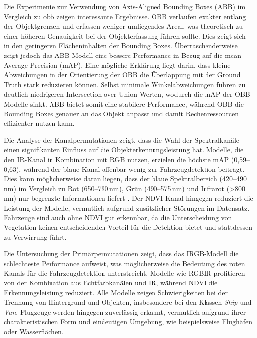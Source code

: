 Die Experimente zur Verwendung von Axis-Aligned Bounding Boxes (ABB) im Vergleich zu \acrfull{obb} zeigen interessante Ergebnisse. OBB verlaufen exakter entlang der Objektgrenzen und erfassen weniger umliegendes Areal, was theoretisch zu einer höheren Genauigkeit bei der Objekterfassung führen sollte. Dies zeigt sich in den geringeren Flächeninhalten der Bounding Boxes. Überraschenderweise zeigt jedoch das ABB-Modell eine bessere Performance in Bezug auf die mean Average Precision (mAP). Eine mögliche Erklärung liegt darin, dass kleine Abweichungen in der Orientierung der OBB die Überlappung mit der Ground Truth stark reduzieren können. Selbst minimale Winkelabweichungen führen zu deutlich niedrigeren Intersection-over-Union-Werten, wodurch die mAP der OBB-Modelle sinkt. ABB bietet somit eine stabilere Performance, während OBB die Bounding Boxes genauer an das Objekt anpasst und damit Rechenressourcen effizienter nutzen kann. 

Die Analyse der Kanalpermutationen zeigt, dass die Wahl der Spektralkanäle einen signifikanten Einfluss auf die Objekterkennungsleistung hat. Modelle, die den IR-Kanal in Kombination mit RGB nutzen, erzielen die höchste mAP (0,59--0,63), während der blaue Kanal offenbar wenig zur Fahrzeugdetektion beiträgt. Dies kann möglicherweise daran liegen, dass der blaue Spektralbereich (420–490\,nm) im Vergleich zu Rot (650–780\,nm), Grün (490–575\,nm) und Infrarot (>800\,nm) nur begrenzte Informationen liefert \cite{bfs_Strahlung}. Der NDVI-Kanal hingegen reduziert die Leistung der Modelle, vermutlich aufgrund zusätzlicher Störungen im Datensatz. Fahrzeuge sind auch ohne NDVI gut erkennbar, da die Unterscheidung von Vegetation keinen entscheidenden Vorteil für die Detektion bietet und stattdessen zu Verwirrung führt. %

Die Untersuchung der Primärpermutationen zeigt, dass das IRGB-Modell die schlechteste Performance aufweist, was möglicherweise die Bedeutung des roten Kanals für die Fahrzeugdetektion unterstreicht. Modelle wie RGBIR profitieren von der Kombination aus Echtfarbkanälen und IR, während NDVI die Erkennungsleistung reduziert. Alle Modelle zeigen Schwierigkeiten bei der Trennung von Hintergrund und Objekten, insbesondere bei den Klassen \emph{Ship} und \emph{Van}. Flugzeuge werden hingegen zuverlässig erkannt, vermutlich aufgrund ihrer charakteristischen Form und eindeutigen Umgebung, wie beispielsweise Flughäfen oder Wasserflächen. %

